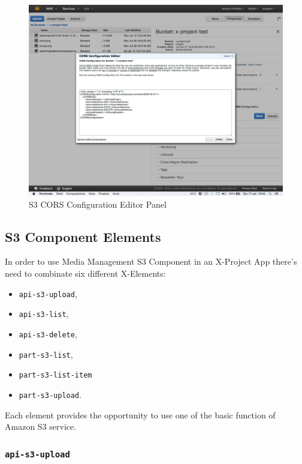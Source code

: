\begin {figure}[h]
\graphicspath{{images/chapter_s3/}}
\includegraphics[width=\textwidth]{s3panel}
\caption{S3 CORS Configuration Editor Panel}
\end {figure}









\subsection{S3 Component Elements}
\label{subsec:S3_server_elem}


In order to use Media Management S3 Component in an X-Project App there's need to combinate six different X-Elements:
\begin{itemize}

\item\texttt{api-s3-upload},
\item\texttt{api-s3-list},
\item\texttt{api-s3-delete},
\item\texttt{part-s3-list},
\item\texttt{part-s3-list-item}
\item\texttt{part-s3-upload}.

\end{itemize}

Each element provides the opportunity to use one of the basic function of Amazon S3 service. 

\subsubsection{\texttt{api-s3-upload}}
\label{api-s3-upload}


